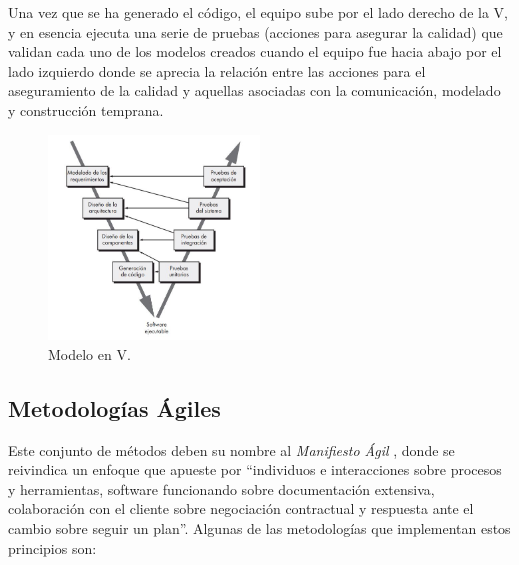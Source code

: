 \begin{itemize}
            Una vez que se ha generado el código, el equipo sube por el lado derecho de la V, y en esencia ejecuta una serie de pruebas (acciones para asegurar la calidad) que validan cada uno de los modelos creados cuando el equipo fue hacia abajo por el lado izquierdo donde se aprecia la relación entre las acciones para  el aseguramiento de la calidad y aquellas asociadas con la comunicación, modelado y construcción temprana. 
        
            \begin{figure}[h]
                \centering
                \includegraphics[width=0.5\textwidth]{figures/en v.JPG}
                \caption[Modelo en V, extraído de \cite{pressman_software_2005}]{Modelo en V.}
                \label{fig:metodologia:modelo_v}
            \end{figure}
        \end{itemize}

    \subsection{Metodologías Ágiles}

        Este conjunto de métodos deben su nombre al \textit{Manifiesto Ágil} \cite{varios_autores_manifiesto_2001}, donde se reivindica un enfoque que apueste por ``individuos e interacciones sobre procesos y herramientas, software funcionando sobre documentación extensiva, colaboración con el cliente sobre negociación contractual y respuesta ante el cambio sobre seguir un plan''.
        Algunas de las metodologías que implementan estos principios son:
    

